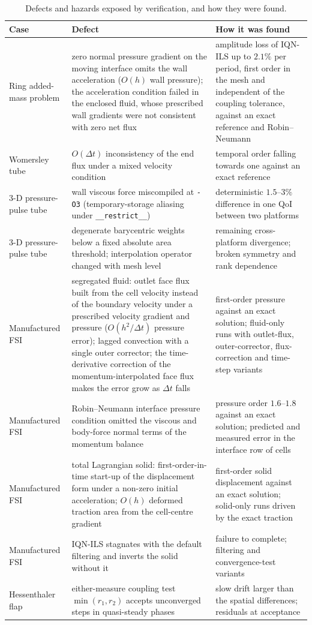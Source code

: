 \begin{table}[htbp]
	\centering
	\footnotesize
	\setlength{\tabcolsep}{3pt}
	\caption{Defects and hazards exposed by verification, and how they were found.}
	\label{tab:defects}
	\begin{tabular}{p{2.6cm}p{5.6cm}p{5.6cm}}
		\toprule
		Case & Defect & How it was found \\
		\midrule
		Ring added-mass problem & zero normal pressure gradient on the moving interface omits the wall acceleration ($O(h)$ wall pressure); the acceleration condition failed in the enclosed fluid, whose prescribed wall gradients were not consistent with zero net flux & amplitude loss of IQN-ILS up to $2.1\%$ per period, first order in the mesh and independent of the coupling tolerance, against an exact reference and Robin--Neumann \\
		Womersley tube & $O(\Delta t)$ inconsistency of the end flux under a mixed velocity condition & temporal order falling towards one against an exact reference \\
		3-D pressure-pulse tube & wall viscous force miscompiled at \texttt{-O3} (temporary-storage aliasing under \texttt{\_\_restrict\_\_}) & deterministic $1.5$--$3\%$ difference in one QoI between two platforms \\
		3-D pressure-pulse tube & degenerate barycentric weights below a fixed absolute area threshold; interpolation operator changed with mesh level & remaining cross-platform divergence; broken symmetry and rank dependence \\
		Manufactured FSI & segregated fluid: outlet face flux built from the cell velocity instead of the boundary velocity under a prescribed velocity gradient and pressure ($O(h^2/\Delta t)$ pressure error); lagged convection with a single outer corrector; the time-derivative correction of the momentum-interpolated face flux makes the error grow as $\Delta t$ falls & first-order pressure against an exact solution; fluid-only runs with outlet-flux, outer-corrector, flux-correction and time-step variants \\
		Manufactured FSI & Robin--Neumann interface pressure condition omitted the viscous and body-force normal terms of the momentum balance & pressure order $1.6$--$1.8$ against an exact solution; predicted and measured error in the interface row of cells \\
		Manufactured FSI & total Lagrangian solid: first-order-in-time start-up of the displacement form under a non-zero initial acceleration; $O(h)$ deformed traction area from the cell-centre gradient & first-order solid displacement against an exact solution; solid-only runs driven by the exact traction \\
		Manufactured FSI & IQN-ILS stagnates with the default filtering and inverts the solid without it & failure to complete; filtering and convergence-test variants \\
		Hessenthaler flap & either-measure coupling test $\min(r_1, r_2)$ accepts unconverged steps in quasi-steady phases & slow drift larger than the spatial differences; residuals at acceptance \\
		\bottomrule
	\end{tabular}
\end{table}

